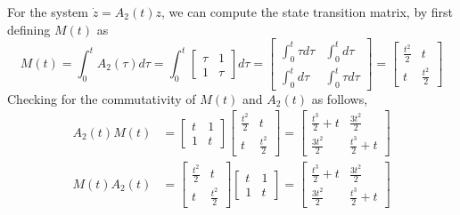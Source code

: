 For the system \( \dot z = A_2(t) z \), we can compute the state transition matrix, by first defining \( M(t) \) as
\begin{equation*}
    M(t)
    =
    \int_{0}^{t} A_2(\tau) d\tau
    =
    \int_{0}^{t} \begin{bmatrix}
        \tau & 1    \\
        1    & \tau
    \end{bmatrix}
    d\tau
    =
    \begin{bmatrix}
        \int_{0}^{t} \tau d\tau & \int_{0}^{t} d\tau      \\
        \int_{0}^{t} d\tau      & \int_{0}^{t} \tau d\tau
    \end{bmatrix}
    =
    \begin{bmatrix}
        \frac{t^2}{2} & t             \\
        t             & \frac{t^2}{2}
    \end{bmatrix}
\end{equation*}
Checking for the commutativity of \( M(t) \) and \( A_2(t) \) as follows,
\begin{align*}
    A_2(t) M(t)
     & =
    \begin{bmatrix}
        t & 1 \\
        1 & t
    \end{bmatrix}
    \begin{bmatrix}
        \frac{t^2}{2} & t             \\
        t             & \frac{t^2}{2}
    \end{bmatrix}
    =
    \begin{bmatrix}
        \frac{t^3}{2} + t & \frac{3t^2}{2}    \\
        \frac{3t^2}{2}    & \frac{t^3}{2} + t
    \end{bmatrix}
    \\
    M(t) A_2(t)
     & =
    \begin{bmatrix}
        \frac{t^2}{2} & t             \\
        t             & \frac{t^2}{2}
    \end{bmatrix}
    \begin{bmatrix}
        t & 1 \\
        1 & t
    \end{bmatrix}
    =
    \begin{bmatrix}
        \frac{t^3}{2} + t & \frac{3t^2}{2}    \\
        \frac{3t^2}{2}    & \frac{t^3}{2} + t
    \end{bmatrix}
\end{align*}

